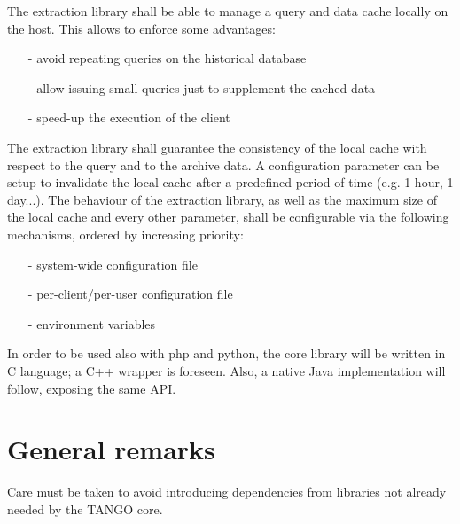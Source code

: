 \documentclass[11pt,a4paper]{article}
\def \tango{TANGO}
\begin{document}
The extraction library shall be able to manage a query and data
cache locally on the host. This allows to enforce some advantages:
\begin{itemize}
	\item[-] avoid repeating queries on the historical database
	\item[-] allow issuing small queries just to supplement the cached data
	\item[-] speed-up the execution of the client
\end{itemize}
The extraction library shall guarantee the consistency of the local
cache with respect to the query and to the archive data.
A configuration parameter can be setup to invalidate the local cache
after a predefined period of time (e.g. 1 hour, 1 day...).
The behaviour of the extraction library, as well as the maximum size
of the local cache and every other parameter, shall be configurable
via the following mechanisms, ordered by increasing priority:
\begin{enumerate}
	\item[-] system-wide configuration file
	\item[-] per-client/per-user configuration file
	\item[-] environment variables
\end{enumerate}

In order to be used also with php and python, the core library will be
written in C language; a C++ wrapper is foreseen. Also, a native Java
implementation will follow, exposing the same API.

\newpage{\clearpage}

\section{General remarks}
Care must be taken to avoid introducing dependencies from libraries
not already needed by the \tango{} core.

\newpage{\clearpage}

\appendix
\end{document}
